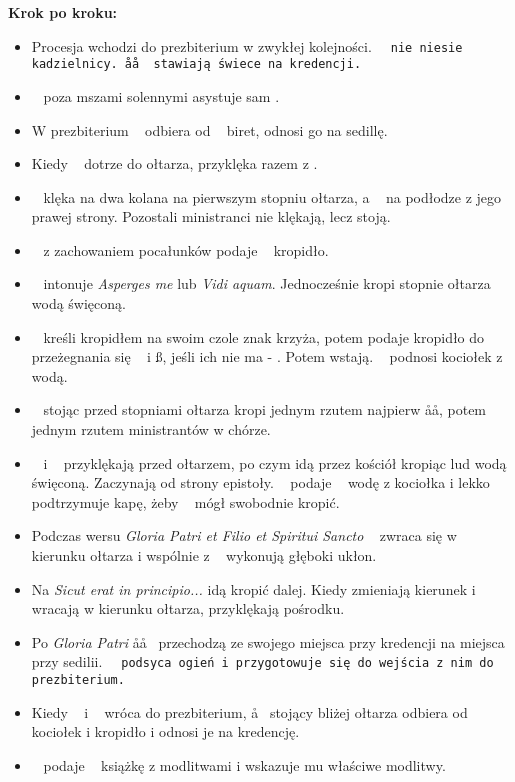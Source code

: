 \textbf{Krok po kroku:}
\begin{itemize}
	\item Procesja wchodzi do prezbiterium w zwykłej kolejności. \tt~ nie niesie
	      kadzielnicy. \aa\aa~ stawiają świece na kredencji.
	\item \ii~ poza mszami solennymi asystuje sam \cc.
	\item W prezbiterium \cc~ odbiera od \ii~ biret, odnosi go na sedillę.
	\item Kiedy \ii~ dotrze do ołtarza, przyklęka razem z \cc.
	\item \ii~ klęka na dwa kolana na pierwszym stopniu ołtarza, a \cc~ na
	      podłodze z jego prawej strony. Pozostali ministranci nie klękają, lecz
	      stoją.
	\item \cc~ z zachowaniem pocałunków podaje \ii~ kropidło.
	\item \ii~ intonuje \textit{Asperges me} lub \textit{Vidi aquam}.
	      Jednocześnie kropi stopnie ołtarza wodą święconą.
	\item \ii~ kreśli kropidłem na swoim czole znak krzyża, potem podaje
	      kropidło do przeżegnania się \dd~ i \ss, jeśli ich nie ma - \cc. Potem
	      wstają. \cc~ podnosi kociołek z wodą.
	\item \ii~ stojąc przed stopniami ołtarza kropi jednym rzutem najpierw
	      \aa\aa, potem jednym rzutem ministrantów w chórze.
	\item \ii~ i \cc~ przyklękają przed ołtarzem, po czym idą przez kościół
	      kropiąc lud wodą święconą. Zaczynają od strony epistoły. \cc~ podaje
	      \ii~ wodę z kociołka i lekko podtrzymuje kapę, żeby \ii~ mógł
	      swobodnie kropić.
	\item Podczas wersu \textit{Gloria Patri et Filio et Spiritui Sancto} \ii~
	      zwraca się w kierunku ołtarza i wspólnie z \cc~ wykonują głęboki
	      ukłon.
	\item Na \textit{Sicut erat in principio...} idą kropić dalej. Kiedy
	      zmieniają kierunek i wracają w kierunku ołtarza, przyklękają pośrodku.
	\item Po \textit{Gloria Patri} \aa\aa~ przechodzą ze swojego miejsca przy
	      kredencji na miejsca przy sedilii. \tt~ podsyca ogień i przygotowuje
	      się do wejścia z nim do prezbiterium.
	\item Kiedy \ii~ i \cc~ wróca do prezbiterium, \aa~ stojący bliżej ołtarza
	      odbiera od \cc~ kociołek i kropidło i odnosi je na kredencję.
	\item \cc~ podaje \ii~ książkę z modlitwami i wskazuje mu właściwe modlitwy.

\end{itemize}
